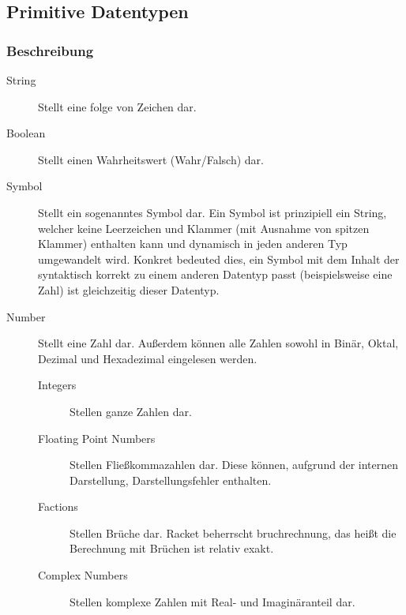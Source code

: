     \subsection{Primitive Datentypen}
        \subsubsection{Beschreibung}
            \begin{description}
                \item[String] Stellt eine folge von Zeichen dar.
                \item[Boolean] Stellt einen Wahrheitswert (Wahr/Falsch) dar.
                \item[Symbol] Stellt ein sogenanntes Symbol dar. Ein Symbol ist prinzipiell ein String, welcher keine Leerzeichen und Klammer (mit Ausnahme von spitzen Klammer) enthalten kann und dynamisch in jeden anderen Typ umgewandelt wird. Konkret bedeuted dies, ein Symbol mit dem Inhalt der syntaktisch korrekt zu einem anderen Datentyp passt (beispielsweise eine Zahl) ist gleichzeitig dieser Datentyp.
                \item[Number] Stellt eine Zahl dar. Außerdem können alle Zahlen sowohl in Binär, Oktal, Dezimal und Hexadezimal eingelesen werden.
                    \begin{description}
                        \item[Integers] Stellen ganze Zahlen dar.
                        \item[Floating Point Numbers] Stellen Fließkommazahlen dar. Diese können, aufgrund der internen Darstellung, Darstellungsfehler enthalten.
                        \item[Factions] Stellen Brüche dar. Racket beherrscht bruchrechnung, das heißt die Berechnung mit Brüchen ist relativ exakt.
                        \item[Complex Numbers] Stellen komplexe Zahlen mit Real- und Imaginäranteil dar.
                    \end{description}
            \end{description}


